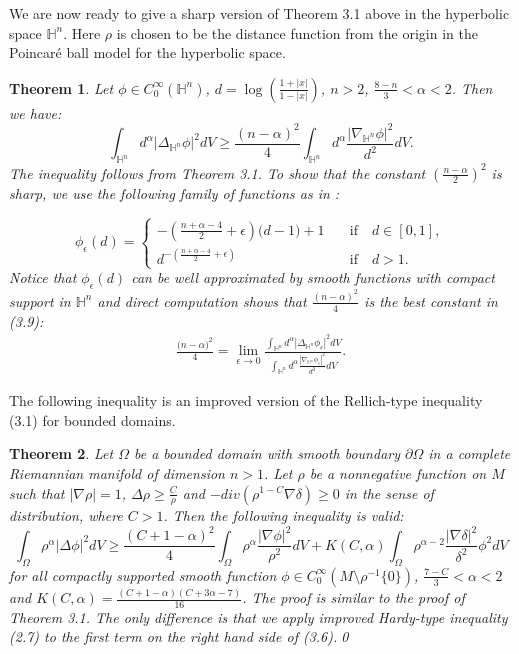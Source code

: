 \documentclass[12pt]{amsart}
\numberwithin{equation}{section}
\newtheorem{theorem}{Theorem}
\numberwithin{theorem}{section}
\numberwithin{theorem}{section} \numberwithin{lemma}{section}
\numberwithin{definition}{section}
\numberwithin{corollary}{section}
\numberwithin{remark}{section}
\numberwithin{proposition}{section}
\begin{document}
We are now ready to give a sharp version of Theorem 3.1 above in the
hyperbolic space $\mathbb{H}^n$. Here  $\rho$ is chosen to be the
distance function from the origin in the Poincar\'e ball model for
the hyperbolic space.
\begin{theorem} Let $\phi\in C_0^{\infty}(\mathbb{H}^n)$, $d=\log(\frac{1+|x|}{1-|x|})$, $n> 2$,
$\frac{8-n}{3}<\alpha<2$. Then we
have:\begin{equation}\int_{\mathbb{H}^n}
d^{\alpha}|\Delta_{\mathbb{H}^n}\phi|^2dV \ge
\frac{(n-\alpha)^2}{4}\int_{\mathbb{H}^n}
d^{\alpha}\frac{|\nabla_{\mathbb{H}^n}
\phi|^2}{d^2}dV.\end{equation} \proof The inequality follows from
Theorem 3.1. To show that the constant $(\frac{n-\alpha}{2})^2$ is
sharp, we use the following family of functions as in
\cite{Kombe-Ozaydin}:

\[\phi_{\epsilon}(d)=\begin{cases}
 -(\frac{n+\alpha-4}{2}+\epsilon)\big(d-1\big)+1 &\quad\text{if}  \quad d\in [0,1],\\
d^{-(\frac{n+\alpha-4}{2}+\epsilon)} &\quad \text{if} \quad d>1.
\end{cases}
\]
Notice that $\phi_{\epsilon}(d)$ can be well approximated by smooth
functions with compact support in $\mathbb{H}^n$ and direct
computation shows that $\frac{(n-\alpha)^2}{4}$ is the best constant
in (3.9):
\[\begin{aligned}\frac{\big(n-\alpha\big)^2}{4}=\lim_{\epsilon\longrightarrow 0}\frac{ \int_{\mathbb{H}^n}
d^{\alpha}|\Delta_{\mathbb{H}^n}\phi_{\epsilon}|^2 dV} {
\int_{\mathbb{H}^n}
d^{\alpha}\frac{|\nabla_{\mathbb{H}^n}\phi_{\epsilon}|^2}{d^2}dV}.
\end{aligned}\]
\end{theorem}
\medskip

 The following inequality is an improved
version of the Rellich-type inequality (3.1) for bounded domains.
\begin{theorem}Let $\Omega$ be a bounded domain with smooth boundary $\partial\Omega$ in a  complete  Riemannian manifold of dimension $n>1$.
  Let $\rho$ be a nonnegative function on $M$ such that
  $|\nabla\rho|=1$,
 $\Delta\rho\ge \frac{C}{\rho}$ and $-div(\rho^{1-C}\nabla\delta)\ge 0$ in the sense of distribution, where $ C>1$.  Then the following inequality is
valid:
\begin{equation}
\int_{\Omega}\rho^{\alpha}|\Delta\phi|^2dV \ge
\frac{(C+1-\alpha)^2}{4}
\int_{\Omega}\rho^{\alpha}\frac{|\nabla\phi|^2}{\rho^{2}}dV+K(C,
\alpha)\int_{\Omega}\rho^{\alpha-2}\frac{|\nabla
\delta|^2}{\delta^2}\phi^2dV
\end{equation}
for all compactly supported smooth function $\phi\in
C_0^{\infty}(M\setminus\rho^{-1}\{0\})$, $\frac{7-C}{3}<\alpha<2$
and $K(C, \alpha)=\frac{(C+1-\alpha)(C+3\alpha-7)}{16}$. \proof The
proof is similar to the proof of Theorem 3.1. The only difference is
that we apply improved Hardy-type inequality (2.7) to the first term
on the right hand side of (3.6).\qed
\end{theorem}
\medskip
\end{document}
